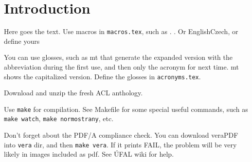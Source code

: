 \chapter{Introduction}%
\label{chap:intro}

Here goes the text. Use macros in \texttt{macros.tex}, such as
. . Or 
English\to{}Czech, or define yours 

You can use glosses, such as \gls{mt} that generate the
expanded version with the abbreviation during the first use, and then only
the acronym for next time. \Gls{mt} shows the capitalized version. Define
the glosses in \texttt{acronyms.tex}.

Download and unzip the fresh ACL anthology.

Use \texttt{make} for compilation. See Makefile for some special useful commands, such as
\texttt{make watch}, \texttt{make normostrany}, etc.

Don't forget about the PDF/A compliance check. You can download veraPDF into
\texttt{vera} dir, and then \texttt{make vera}. If it prints FAIL, the problem will
be very likely in images included as pdf. See ÚFAL
wiki for help.
